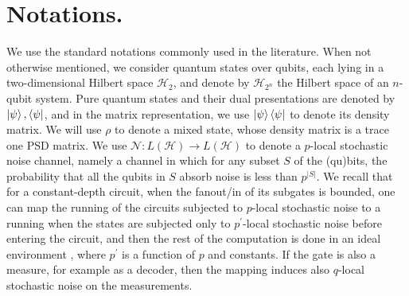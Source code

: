 \documentclass[manuscript,screen,review]{acmart}
\begin{document}
{  \section{ Notations. } \label{sec:nota}

  We use the standard notations commonly used in the literature. When not otherwise mentioned, we consider quantum states over qubits, each lying in a two-dimensional Hilbert space $\mathcal{H}_{2}$, and denote by $\mathcal{H}_{2^n}$ the Hilbert space of an $n$-qubit system. Pure quantum states and their dual presentations are denoted by $\ket{\psi}, \bra{\psi}$, and in the matrix representation, we use $\ket{\psi}\bra{\psi}$ to denote its density matrix. We will use $\rho$ to denote a mixed state, whose density matrix is a trace one PSD matrix. We use $\mathcal{N} : L(\mathcal{H}) \rightarrow L(\mathcal{H})$ to denote a $p$-local stochastic noise channel, namely a channel in which for any subset $S$ of the (qu)bits, the probability that all the qubits in $S$ absorb noise is less than $p^{|S|}$. We recall that for a constant-depth circuit, when the fanout/in of its subgates is bounded, one can map the running of the circuits subjected to $p$-local stochastic noise to a running when the states are subjected only to $p^{\prime}$-local stochastic noise before entering the circuit, and then the rest of the computation is done in an ideal environment \cite{gottesman2014faulttolerant}, where $p^{\prime}$ is a function of $p$ and constants. If the gate is also a measure, for example as a decoder, then the mapping induces also $q$-local stochastic noise on the measurements.

}
\end{document}
